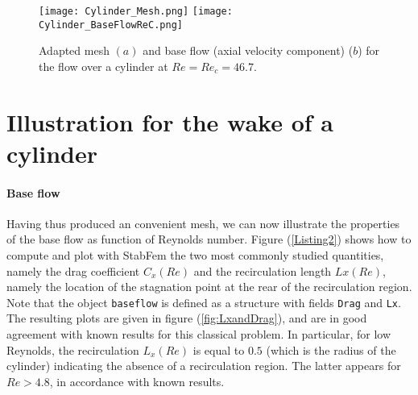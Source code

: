 \documentclass[twocolumn,10pt]{asme2ej}
\begin{document}
\begin{figure}
\texttt{[image: Cylinder\_Mesh.png]}
\texttt{[image: Cylinder\_BaseFlowReC.png]}
\caption{Adapted mesh $(a)$  and base flow (axial velocity component) ($b$) for the flow over a cylinder at $Re=Re_c = 46.7$.}
\label{fig:Baseflow}
\end{figure}



\section{Illustration for the wake of a cylinder} 
\vspace{.2cm}


\paragraph{Base flow}

Having thus produced an convenient mesh, we can now illustrate the properties of the base flow as function of Reynolds number. Figure (\ref{Listing2}) shows how to compute and plot with StabFem the two most commonly studied quantities, namely the drag coefficient $C_x(Re)$  and the recirculation length $Lx(Re)$, namely the location of the stagnation point at the rear of the recirculation region. 
Note that the object \verb|baseflow| is defined as a structure with fields \verb|Drag| and \verb|Lx|. 
The resulting plots are given in figure (\ref{fig:LxandDrag}), and are in good agreement with known results for this classical problem.
In particular, for low Reynolds, the recirculation $L_x(Re)$ is equal to $0.5$ (which is the radius of the cylinder) indicating the absence of a recirculation region. The latter appears for $Re > 4.8$, in accordance with known results.





\end{document}
